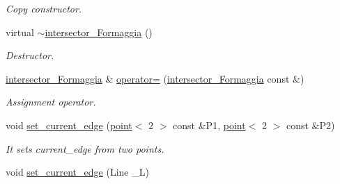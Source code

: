\begin{DoxyCompactItemize}
\begin{DoxyCompactList}\small\item\em Copy constructor. \item\end{DoxyCompactList}\item 
\hypertarget{classintersector__Formaggia_a43462fd48813da7d9a75cd1d2bb9f773}{
virtual \hyperlink{classintersector__Formaggia_a43462fd48813da7d9a75cd1d2bb9f773}{$\sim$intersector\_\-Formaggia} ()}
\label{classintersector__Formaggia_a43462fd48813da7d9a75cd1d2bb9f773}

\begin{DoxyCompactList}\small\item\em Destructor. \item\end{DoxyCompactList}\item 
\hypertarget{classintersector__Formaggia_a16f5fc3859d4ead618b50fce27ad223c}{
\hyperlink{classintersector__Formaggia}{intersector\_\-Formaggia} \& \hyperlink{classintersector__Formaggia_a16f5fc3859d4ead618b50fce27ad223c}{operator=} (\hyperlink{classintersector__Formaggia}{intersector\_\-Formaggia} const \&)}
\label{classintersector__Formaggia_a16f5fc3859d4ead618b50fce27ad223c}

\begin{DoxyCompactList}\small\item\em Assignment operator. \item\end{DoxyCompactList}\item 
\hypertarget{classintersector__Formaggia_adc80ffbc2bfbaa39b37ec7366895f40e}{
void \hyperlink{classintersector__Formaggia_adc80ffbc2bfbaa39b37ec7366895f40e}{set\_\-current\_\-edge} (\hyperlink{classpoint}{point}$<$ 2 $>$ const \&P1, \hyperlink{classpoint}{point}$<$ 2 $>$ const \&P2)}
\label{classintersector__Formaggia_adc80ffbc2bfbaa39b37ec7366895f40e}

\begin{DoxyCompactList}\small\item\em It sets current\_\-edge from two points. \item\end{DoxyCompactList}\item 
\hypertarget{classintersector__Formaggia_a40f056de998f9e55311e3760290266a4}{
void \hyperlink{classintersector__Formaggia_a40f056de998f9e55311e3760290266a4}{set\_\-current\_\-edge} (Line \_\-L)}
\label{classintersector__Formaggia_a40f056de998f9e55311e3760290266a4}


\end{DoxyCompactItemize}
